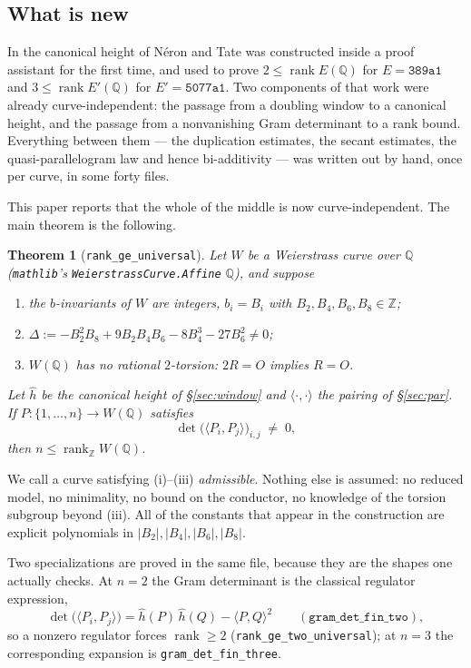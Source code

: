 \documentclass[11pt,reqno]{amsart}
\theoremstyle{plain}
\newtheorem{theorem}{Theorem}[section]
\theoremstyle{definition}
\theoremstyle{remark}
\DeclareRobustCommand{\lt}[1]{\texttt{#1}}
\newcommand{\hh}{\widehat{h}}
\DeclareMathOperator{\rank}{rank}
\begin{document}
\subsection{What is new}

In \cite{MW} the canonical height of N\'eron and Tate was constructed
inside a proof assistant for the first time, and used to prove
$2 \le \rank E(\mathbb{Q})$ for $E = \mathtt{389a1}$ and
$3 \le \rank E'(\mathbb{Q})$ for $E' = \mathtt{5077a1}$. Two components
of that work were already curve-independent: the passage from a doubling
window to a canonical height, and the passage from a nonvanishing Gram
determinant to a rank bound. Everything between them --- the duplication
estimates, the secant estimates, the quasi-parallelogram law and hence
bi-additivity --- was written out by hand, once per curve, in some forty
files.

This paper reports that the whole of the middle is now
curve-independent. The main theorem is the following.

\begin{theorem}[\lt{rank\_ge\_universal}]\label{thm:main}
Let $W$ be a Weierstrass curve over $\mathbb{Q}$ (\texttt{mathlib}'s
\lt{WeierstrassCurve.Affine} $\mathbb{Q}$), and suppose
\begin{enumerate}[label=\textup{(\roman*)}]
  \item the $b$-invariants of $W$ are integers,
        $b_i = B_i$ with $B_2,B_4,B_6,B_8 \in \mathbb{Z}$;
  \item $\Delta := -B_2^2B_8 + 9B_2B_4B_6 - 8B_4^3 - 27B_6^2 \ne 0$;
  \item $W(\mathbb{Q})$ has no rational $2$-torsion: $2R = O$ implies
        $R = O$.
\end{enumerate}
Let $\hh$ be the canonical height of \S\ref{sec:window} and
$\langle\cdot,\cdot\rangle$ the pairing of \S\ref{sec:par}. If
$P \colon \{1,\dots,n\} \to W(\mathbb{Q})$ satisfies
\[
  \det\bigl(\langle P_i, P_j\rangle\bigr)_{i,j} \;\ne\; 0,
\]
then $n \le \rank_{\mathbb{Z}} W(\mathbb{Q})$.
\end{theorem}

We call a curve satisfying (i)--(iii) \emph{admissible}. Nothing else is
assumed: no reduced model, no minimality, no bound on the conductor, no
knowledge of the torsion subgroup beyond (iii). All of the constants
that appear in the construction are explicit polynomials in
$\lvert B_2\rvert, \lvert B_4\rvert, \lvert B_6\rvert, \lvert
B_8\rvert$.

Two specializations are proved in the same file, because they are the
shapes one actually checks. At $n = 2$ the Gram determinant is the
classical regulator expression,
\begin{equation}\label{eq:reg2}
  \det\bigl(\langle P_i,P_j\rangle\bigr)
   = \hh(P)\,\hh(Q) - \langle P,Q\rangle^2
   \qquad (\lt{gram\_det\_fin\_two}),
\end{equation}
so a nonzero regulator forces $\rank \ge 2$
(\lt{rank\_ge\_two\_universal}); at $n = 3$ the corresponding expansion
is \lt{gram\_det\_fin\_three}.
\end{document}
